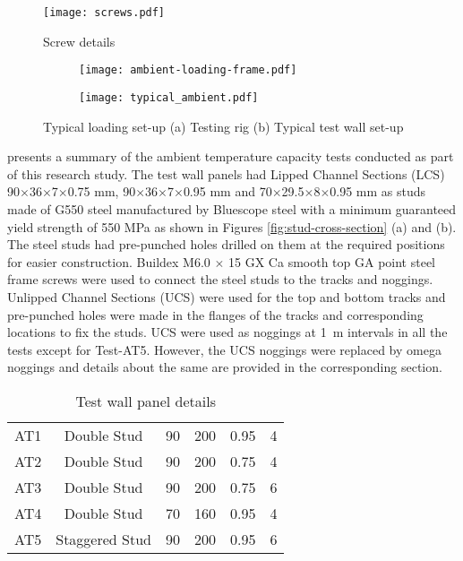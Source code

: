 \begin{figure}[htbp]
	\centering
			\texttt{[image: screws.pdf]}
		\caption{Screw details}
		\label{fig:screw-details}
\end{figure}
\begin{figure}
	\centering
	\begin{subfigure}[b]{0.75\textwidth}
		\centering
		\texttt{[image: ambient-loading-frame.pdf]}
		\caption{}
		\label{subfig:ambient-loading-frame}
	\end{subfigure}
	\begin{subfigure}[b]{0.5\textwidth}
		\centering
		\texttt{[image: typical\_ambient.pdf]}
		\caption{}
		\label{subfig:typical_ambient}
	\end{subfigure}
	   \caption{Typical loading set-up (a) Testing rig (b) Typical test wall set-up}
	   \label{fig:typical-loading}
\end{figure}

 presents a summary of the ambient temperature capacity tests conducted as part of this research study. The test wall panels had Lipped Channel Sections (LCS) 90$\times$36$\times$7$\times$0.75 mm, 90$\times$36$\times$7$\times$0.95 mm and 70$\times$29.5$\times$8$\times$0.95 mm as studs made of G550 steel manufactured by Bluescope steel with a minimum guaranteed yield strength of 550 MPa as shown in Figures \ref{fig:stud-cross-section} (a) and (b). The steel studs had pre-punched holes drilled on them at the required positions for easier construction. Buildex M6.0 $\times$ 15 GX Ca smooth top GA point steel frame screws were used to connect the steel studs to the tracks and noggings. Unlipped Channel Sections (UCS) were used for the top and bottom tracks and pre-punched holes were made in the flanges of the tracks and corresponding locations to fix the studs. UCS were used as noggings at 1~m intervals in all the tests except for Test-AT5. However, the UCS noggings were replaced by omega noggings and details about the same are provided in the corresponding section.
\begin{table}[!htbp]
	\centering
	\caption{Test wall panel details}
	\begin{tabular}{cccccc}
		\toprule
		\multicolumn{1}{m{2.4em}}{\centering{Test Name}} & 
		\multicolumn{1}{m{5.6em}}{\centering{Description}} & 
		\multicolumn{1}{m{2.85em}}{\centering{Stud Depth (mm)}} & 
		\multicolumn{1}{m{2.85em}}{\centering{Cavity Depth (mm)}} & 
		\multicolumn{1}{m{5em}}{\centering{Stud Thickness (mm)}} & 
		\multicolumn{1}{m{3em}}{\centering{No of Studs}} \\
		\midrule
		AT1  & Double Stud & 90 & 200 & 0.95 & 4 \\
		AT2  & Double Stud & 90 & 200 & 0.75 & 4 \\
		AT3  & Double Stud & 90 & 200 & 0.75 & 6 \\
		AT4  & Double Stud & 70 & 160 & 0.95 & 4 \\
		AT5  & Staggered Stud & 90 & 200 & 0.95 & 6 \\
		\bottomrule
	\end{tabular}%
	\label{tab:ambient-test-specimens}%
\end{table}%

